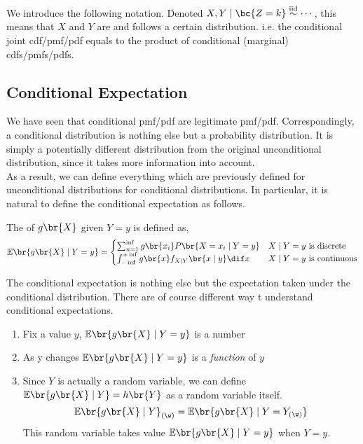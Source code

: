 \documentclass{article}
\newcommand{\Exp}{\mathbb{E}}
\begin{document}
We introduce the following notation. Denoted $X,Y \mid \bc{Z = k} \stackrel{\text{iid}}{\sim}\cdots$, this means that $X$ and $Y$ are  and follows a certain distribution. i.e. the conditional joint cdf/pmf/pdf equals to the product of conditional (marginal) cdfs/pmfs/pdfs.

\subsection{Conditional Expectation}
We have seen that conditional pmf/pdf are legitimate pmf/pdf. Correspondingly, a conditional distribution is nothing else but a probability distribution. It is simply a potentially different distribution from the original unconditional distribution, since it takes more information into account. \\

As a result, we can define everything which are previously defined for unconditional distributions for conditional distributions. In particular, it is natural to define the conditional expectation as follows.
\begin{definition}
    The  of $g\br{X}$ given $Y=y$ is defined as,
    \[ \Exp\br{g\br{X} \mid Y = y} = \begin{cases}
        \sum_{n=1}^{\inf} g\br{x_i}P\br{X=x_i \mid Y=y} & X \mid Y=y \text{ is discrete}\\
        \int_{-\inf}^{+\inf} g\br{x} f_{X\mid Y}\br{x \mid y} \dif x & X \mid Y=y \text{ is continuous}
    \end{cases} \]
\end{definition}
The conditional expectation is nothing else but the expectation taken under the conditional distribution. There are of course different way t understand conditional expectations.
\begin{enumerate}
    \item Fix a value $y$, $\Exp\br{g\br{X} \mid Y = y}$ is a number
    \item As y changes $\Exp\br{g\br{X} \mid Y = y}$ is a \textit{function} of $y$
    \item Since $Y$ is actually a random variable, we can define $\Exp\br{g\br{X} \mid Y} = h\br{Y}$ as a random variable itself.
    \[ \Exp\br{g\br{X} \mid Y}_{(\w)} = \Exp\br{g\br{X} \mid Y = Y_{(\w)}} \]
    This random variable takes value $\Exp\br{g\br{X} \mid Y = y}$ when $Y=y$.
\end{enumerate}
\end{document}
